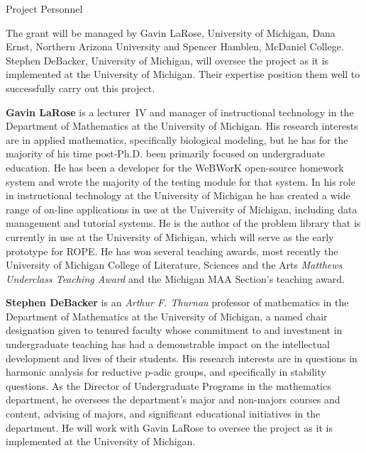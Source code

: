 \documentclass[11pt]{article}
\begin{document}
\begin{section}{Project Personnel}

The grant will be managed by Gavin LaRose, University of Michigan, Dana
Ernst, Northern Arizona University and Spencer Hamblen, McDaniel College.
Stephen DeBacker, University of Michigan, will oversee the project as it
is implemented at the University of Michigan.  Their expertise position
them well to successfully carry out this project.

\textbf{Gavin LaRose} is a lecturer~IV and manager of instructional
technology in the Department of Mathematics at the University of Michigan.
His research interests are in applied mathematics, specifically biological
modeling, but he has for the majority of his time post-Ph.D. been
primarily focused on undergraduate education.  He has been a developer for
the WeBWorK open-source homework system and wrote the majority of the
testing module for that system.  In his role in instructional technology
at the University of Michigan he has created a wide range of on-line
applications in use at the University of Michigan, including data
management and tutorial systems.  He is the author of the problem library
that is currently in use at the University of Michigan, which will serve
as the early prototype for ROPE.  He has won several teaching awards,
most recently the University of Michigan College of Literature, Sciences
and the Arts \emph{Matthews Underclass Teaching Award} and the Michigan
MAA Section's teaching award.

\textbf{Stephen DeBacker} is an \emph{Arthur F. Thurnau} professor of
mathematics in the Department of Mathematics at the University of
Michigan, a named chair designation given to tenured faculty whose
commitment to and investment in undergraduate teaching has had a
demonstrable impact on the intellectual development and lives of their
students.  His research interests are in questions in harmonic analysis
for reductive p-adic groups, and specifically in stability questions.  As
the Director of Undergraduate Programs in the mathematics department, he
oversees the department's major and non-majors courses and content,
advising of majors, and significant educational initiatives in the
department.  He will work with Gavin LaRose to oversee the project as it
is implemented at the University of Michigan.


\end{section}
\end{document}
